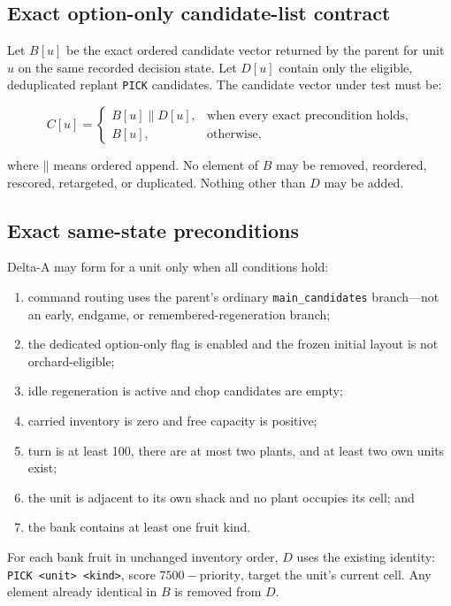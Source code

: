 \documentclass[10pt,a4paper]{article}
\newcommand{\code}[1]{\texttt{#1}}
\begin{document}
\subsection{Exact option-only candidate-list contract}

Let $B[u]$ be the exact ordered candidate vector returned by the parent for unit $u$ on the same
recorded decision state. Let $D[u]$ contain only the eligible, deduplicated replant \code{PICK}
candidates. The candidate vector under test must be:

\[
C[u] =
\begin{cases}
B[u] \mathbin{\|} D[u], & \text{when every exact precondition holds},\\
B[u], & \text{otherwise,}
\end{cases}
\]

where $\mathbin{\|}$ means ordered append. No element of $B$ may be removed, reordered, rescored,
retargeted, or duplicated. Nothing other than $D$ may be added.

\subsection{Exact same-state preconditions}

Delta-A may form for a unit only when all conditions hold:

\begin{enumerate}
  \item command routing uses the parent's ordinary \code{main\_candidates} branch—not an early,
        endgame, or remembered-regeneration branch;
  \item the dedicated option-only flag is enabled and the frozen initial layout is not
        orchard-eligible;
  \item idle regeneration is active and chop candidates are empty;
  \item carried inventory is zero and free capacity is positive;
  \item turn is at least 100, there are at most two plants, and at least two own units exist;
  \item the unit is adjacent to its own shack and no plant occupies its cell; and
  \item the bank contains at least one fruit kind.
\end{enumerate}

For each bank fruit in unchanged inventory order, $D$ uses the existing identity:
\code{PICK <unit> <kind>}, score $7500 - \text{priority}$, target the unit's current cell. Any
element already identical in $B$ is removed from $D$.
\end{document}
